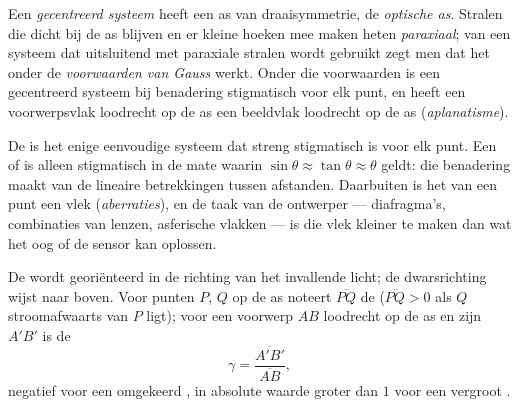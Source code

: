 \begin{definition}\label{def:b1:mirrors-thin-lenses:gauss}
Een \emph{gecentreerd systeem} heeft een as van draaisymmetrie, de
\emph{optische as}. Stralen die dicht bij de as blijven en er kleine hoeken
mee maken heten \emph{paraxiaal}; van een systeem dat uitsluitend met
paraxiale stralen wordt gebruikt zegt men dat het onder de
\emph{voorwaarden van Gauss} werkt. Onder die voorwaarden is een gecentreerd
systeem bij benadering stigmatisch voor elk punt, en heeft een voorwerpsvlak
loodrecht op de as een beeldvlak loodrecht op de as (\emph{aplanatisme}).
\end{definition}
\admitted

\begin{remark}\label{rem:b1:mirrors-thin-lenses:why}
De  is het enige eenvoudige systeem dat streng stigmatisch is
voor elk punt. Een  of  is alleen stigmatisch in de mate
waarin $\sin\theta \approx \tan\theta \approx \theta$ geldt: die benadering
maakt van de  lineaire betrekkingen tussen afstanden. Daarbuiten
is het  van een punt een vlek (\emph{aberraties}), en de taak van de
ontwerper --- diafragma's, combinaties van lenzen, asferische vlakken --- is
die vlek kleiner te maken dan wat het oog of de sensor kan oplossen.
\end{remark}

\begin{notation}\label{not:b1:mirrors-thin-lenses:signs}
De  wordt georiënteerd in de richting van het invallende licht;
de dwarsrichting wijst naar boven. Voor punten $P$, $Q$ op de as noteert
$\overline{PQ}$ de  ($\overline{PQ} > 0$
als $Q$ stroomafwaarts van $P$ ligt); voor een voorwerp $AB$ loodrecht op de
as en zijn  $A'B'$ is de \emph{}
\[
\gamma = \frac{\overline{A'B'}}{\overline{AB}} ,
\]
negatief voor een omgekeerd , in absolute waarde groter dan $1$ voor een
vergroot .
\end{notation}

